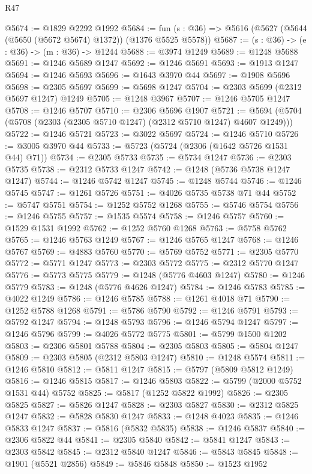 \begin{lexlean}{R47}
\begin{coremodule}
@5674 := @1829 @2292 @1992
@5684 := fun (s : @36) => @5616 (@5627 (@5644 (@5650 (@5672 @5674) @1372)) (@1376 @5525 @5578))
@5687 := (s : @36) -> (e : @36) -> (m : @36) -> @1244
@5688 := @3974 @1249
@5689 := @1248 @5688
@5691 := @1246 @5689 @1247
@5692 := @1246 @5691
@5693 := @1913 @1247
@5694 := @1246 @5693
@5696 := @1643 @3970 @44
@5697 := @1908 @5696
@5698 := @2305 @5697
@5699 := @5698 @1247
@5704 := @2303 @5699 (@2312 @5697 @1247) @1249
@5705 := @1248 @3967
@5707 := @1246 @5705 @1247
@5708 := @1246 @5707
@5710 := @2306 @5696 @1907
@5721 := @5694 (@5704 (@5708 (@2303 (@2305 @5710 @1247) (@2312 @5710 @1247) @4607 @1249)))
@5722 := @1246 @5721
@5723 := @3022 @5697
@5724 := @1246 @5710
@5726 := @3005 @3970 @44
@5733 := @5723 (@5724 (@2306 (@1642 @5726 @1531 @44) @71))
@5734 := @2305 @5733
@5735 := @5734 @1247
@5736 := @2303 @5735
@5738 := @2312 @5733 @1247
@5742 := @1248 (@5736 @5738 @1247 @1247)
@5744 := @1246 @5742 @1247
@5745 := @1248 @5744
@5746 := @1246 @5745
@5747 := @1261 @5726
@5751 := @4026 @5735 @5738 @71 @44
@5752 := @5747 @5751
@5754 := @1252 @5752 @1268
@5755 := @5746 @5754
@5756 := @1246 @5755
@5757 := @1535 @5574
@5758 := @1246 @5757
@5760 := @1529 @1531 @1992
@5762 := @1252 @5760 @1268
@5763 := @5758 @5762
@5765 := @1246 @5763 @1249
@5767 := @1246 @5765 @1247
@5768 := @1246 @5767
@5769 := @4883 @5760
@5770 := @5769 @5752
@5771 := @2305 @5770
@5772 := @5771 @1247
@5773 := @2303 @5772
@5775 := @2312 @5770 @1247
@5776 := @5773 @5775
@5779 := @1248 (@5776 @4603 @1247)
@5780 := @1246 @5779
@5783 := @1248 (@5776 @4626 @1247)
@5784 := @1246 @5783
@5785 := @4022 @1249
@5786 := @1246 @5785
@5788 := @1261 @4018 @71
@5790 := @1252 @5788 @1268
@5791 := @5786 @5790
@5792 := @1246 @5791
@5793 := @5792 @1247
@5794 := @1248 @5793
@5796 := @1246 @5794 @1247
@5797 := @1246 @5796
@5799 := @4026 @5772 @5775
@5801 := @5799 @1500 @1202
@5803 := @2306 @5801 @5788
@5804 := @2305 @5803
@5805 := @5804 @1247
@5809 := @2303 @5805 (@2312 @5803 @1247)
@5810 := @1248 @5574
@5811 := @1246 @5810
@5812 := @5811 @1247
@5815 := @5797 (@5809 @5812 @1249)
@5816 := @1246 @5815
@5817 := @1246 @5803
@5822 := @5799 (@2000 @5752 @1531 @44) @5752
@5825 := @5817 (@1252 @5822 @1992)
@5826 := @2305 @5825
@5827 := @5826 @1247
@5828 := @2303 @5827
@5830 := @2312 @5825 @1247
@5832 := @5828 @5830 @1247
@5833 := @1248 @4023
@5835 := @1246 @5833 @1247
@5837 := @5816 (@5832 @5835)
@5838 := @1246 @5837
@5840 := @2306 @5822 @44
@5841 := @2305 @5840
@5842 := @5841 @1247
@5843 := @2303 @5842
@5845 := @2312 @5840 @1247
@5846 := @5843 @5845
@5848 := @1901 (@5521 @2856)
@5849 := @5846 @5848
@5850 := @1523 @1952

\end{coremodule}
\end{lexlean}

